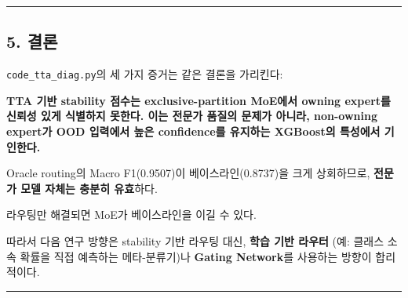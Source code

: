 \medskip\hrule\medskip
\subsection{5. 결론}
\texttt{code\_\allowbreak{}\allowbreak{}tta\allowbreak{}\_\allowbreak{}\allowbreak{}diag.\allowbreak{}py\allowbreak{}}의 세 가지 증거는 같은 결론을 가리킨다:

\textbf{TTA 기반 stability 점수는 exclusive-partition MoE에서 owning expert를 신뢰성 있게 식별하지 못한다. 이는 전문가 품질의 문제가 아니라, non-owning expert가 OOD 입력에서 높은 confidence를 유지하는 XGBoost의 특성에서 기인한다.}



\par\noindent \textbullet\enspace Oracle routing의 Macro F1(0.9507)이 베이스라인(0.8737)을 크게 상회하므로, \textbf{전문가 모델 자체는 충분히 유효}하다.


\par\noindent \textbullet\enspace 라우팅만 해결되면 MoE가 베이스라인을 이길 수 있다.


\par\noindent \textbullet\enspace 따라서 다음 연구 방향은 stability 기반 라우팅 대신, \textbf{학습 기반 라우터} (예: 클래스 소속 확률을 직접 예측하는 메타-분류기)나 \textbf{Gating Network}를 사용하는 방향이 합리적이다.



\medskip\hrule\medskip
